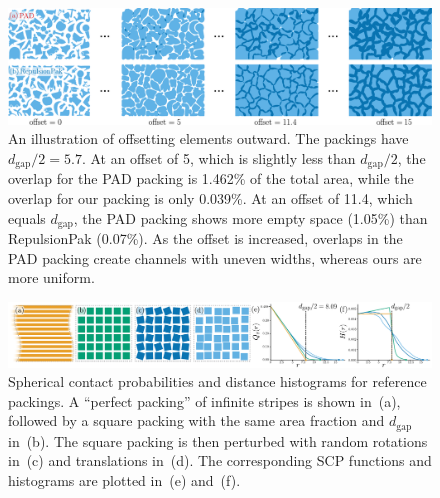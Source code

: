\begin{figure}
\centering
\includegraphics[width=1.0\textwidth]{figures/metrics/overlap_metric.pdf}
\caption[An illustration of offsetting elements outward]
{\label{fig_overlap_function}
    An illustration of offsetting elements outward. The packings have $d_\mathrm{gap} / 2 = 5.7$.  
    At an offset of 5, which is slightly less than $d_\mathrm{gap} / 2$,
    the overlap for the PAD packing is 1.462\% of the total area, while the overlap for our packing is only 0.039\%.
    At an offset of 11.4, which equals $d_\mathrm{gap}$, the PAD packing shows more empty space (1.05\%) than RepulsionPak (0.07\%).
    As the offset is increased, overlaps in the PAD packing create channels
  with uneven widths, whereas ours are more uniform.
  }
\end{figure}

\begin{figure}
\centering
\includegraphics[width=1.0\textwidth]{figures/metrics/hsr_viz.pdf}
\caption[Spherical contact probabilities and distance histograms \newline for reference packings]
{\label{hsr_viz}
Spherical contact probabilities and distance histograms for 
reference packings.
A ``perfect packing'' of infinite stripes is shown in~(a),
followed by a square packing with the same area fraction and $d_\mathrm{gap}$
in~(b).  The square packing is then perturbed with random rotations in~(c)
and translations in~(d). The corresponding SCP functions and histograms are plotted
in~(e) and~(f).}
\end{figure}

